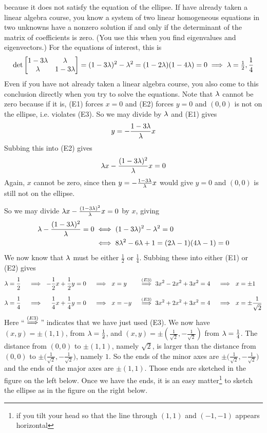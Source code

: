 \begin{eg}
{because it does not satisfy the equation of the ellipse. If have already
taken a linear algebra course, you know a system of two linear homogeneous
equations in two unknowns have a nonzero solution if and only if the determinant
of the matrix of coefficients is zero. (You use this when you find eigenvalues
and eigenvectors.) For the equations of interest, this
is 
$$
\det\left[\begin{matrix}
                 1-3\lambda&\lambda\\
                \lambda&1-3\lambda
          \end{matrix}\right]=(1-3\lambda)^2-\lambda^2
=(1-2\lambda)(1-4\lambda)=0\implies\lambda=\tfrac{1}{2},\frac{1}{4}
$$
Even if you have not already taken a linear algebra course, you also come to
this conclusion directly when you try to solve the equations. 
}%
Note that $\lambda$ cannot be zero because if it is, (E1)
forces $x=0$ and (E2) forces $y=0$ and $(0,0)$ is 
not on the ellipse, i.e. violates (E3).  So we may divide by $\lambda$ and (E1) 
gives 
\begin{equation*}
y=-\frac{1-3\lambda}{\lambda}x
\end{equation*}
Subbing this into (E2) gives 
\begin{equation*}
\lambda x-\frac{(1-3\lambda)^2}{\lambda}x=0
\end{equation*}
Again, $x$ cannot be zero, since
then $y=-\frac{1-3\lambda}{\lambda}x$ would give $y=0$ and $(0,0)$ is still not
on the ellipse. 

So we may divide $\lambda x-\frac{(1-3\lambda)^2}{\lambda}x=0$
by $x$, giving
\begin{align*}
\lambda -\frac{(1-3\lambda)^2}{\lambda}=0
&\iff (1-3\lambda)^2-\lambda^2=0 \\
&\iff 8\lambda^2-6\lambda+1 =(2\lambda-1)(4\lambda-1)=0
\end{align*} 
We now know that $\lambda$ must be either $\frac{1}{2}$ or $\frac{1}{4}$. 
Subbing these into either (E1) or (E2) gives
\begin{alignat*}{5}
\la&=\frac{1}{2}
        &\ \implies\  -\frac{1}{2} x+\frac{1}{2} y&=0 
        &\ \implies\   x&=y
        &\ \impliesover{(E3)}\  3x^2-2x^2+3x^2&=4
        &\ \implies\   x&=\pm 1\\[0.1in]
\la&=\frac{1}{4}
        &\ \implies\  \phantom{-}\frac{1}{4} x+\frac{1}{4} y&=0 
        &\ \implies\  x&=-y
        &\ \impliesover{(E3)}\   3x^2+2x^2+3x^2&=4
        &\ \implies\  x&=\pm \frac{1}{\sqrt{2}}
\end{alignat*}
Here ``$\impliesover{(E3)}$'' indicates that we have
just used (E3). We now have $(x,y)=\pm (1,1)$, from $\lambda=\frac{1}{2}$,
and $(x,y)=\pm\left(\frac{1}{\sqrt{2}},-\frac{1}{\sqrt{2}}\right)$ from
$\lambda=\frac{1}{4}$.
The distance from $(0,0)$ to $\pm (1,1)$, namely $\sqrt{2}$,
is larger than the distance from $(0,0)$ to 
$\pm\big(\frac{1}{\sqrt{2}},-\frac{1}{\sqrt{2}}\big)$, namely $1$.
So the ends of the minor axes are $\pm\big(\frac{1}{\sqrt{2}},-\frac{1}{\sqrt{2}}\big)$ and the 
ends of the major axes are $\pm(1,1)$. Those ends are sketched in the
figure on the left below. Once we have the ends, it is an easy 
matter\footnote{if you tilt your head so that the line through
$(1,1)$ and $(-1,-1)$ appears horizontal}
to sketch the ellipse as in the figure on the right below.


\end{eg}
